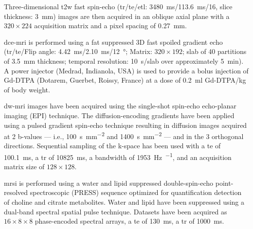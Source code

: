Three-dimensional \ac{t2w} fast spin-echo (\ac{tr}/\ac{te}/\ac{etl}: \SI{3480}{\ms}/\SI{113.6}{\ms}/16, slice thickness: \SI{3}{\mm}) images are then acquired in an oblique axial plane with a  $320 \times 224$ acquisition matrix and a pixel spacing of \SI{0.27}{\milli\metre}.


\ac{dce}-\ac{mri} is performed using a fat suppressed 3D fast spoiled gradient echo (\ac{tr}/\ac{te}/Flip angle: \SI{4.42}{\ms}/\SI{2.10}{\ms}/\SI{12}{\degree}; Matrix: $320 \times 192$; slab of 40 partitions of \SI{3.5}{\mm} thickness; temporal resolution: \SI{10}{\s}/slab over approximately \SI{5}{\minute}).
A power injector (Medrad, Indianola, USA) is used to provide a bolus injection of Gd-DTPA (Dotarem, Guerbet, Roissy, France) at a dose of \SI{0.2}{\ml} Gd-DTPA/kg of body weight.

\ac{dw}-\ac{mri} images have been acquired using the single-shot spin-echo echo-planar imaging (EPI) technique.
The diffusion-encoding gradients have been applied using a pulsed gradient spin-echo technique resulting in diffusion images acquired at 2 b-values --- i.e., \SI{100}{\second\per\milli\meter\squared} and \SI{1400}{\second\per\milli\meter\squared} --- and in the 3 orthogonal directions.
Sequential sampling of the k-space has been used with a \ac{te} of \SI{100.1}{\ms}, a \ac{tr} of \SI{10825}{\ms}, a bandwidth of \SI{1953}{\hertz\per\px}, and an acquisition matrix size of $128 \times 128$.

\ac{mrsi} is performed using a water and lipid suppressed double-spin-echo point-resolved spectroscopic (PRESS) sequence optimized for quantification detection of choline and citrate metabolites.
Water and lipid have been suppressed using a dual-band spectral spatial pulse technique.
Datasets have been acquired as $16 \times 8 \times 8$ phase-encoded spectral arrays, a \ac{te} of \SI{130}{\ms}, a \ac{tr} of \SI{1000}{\ms}.%

